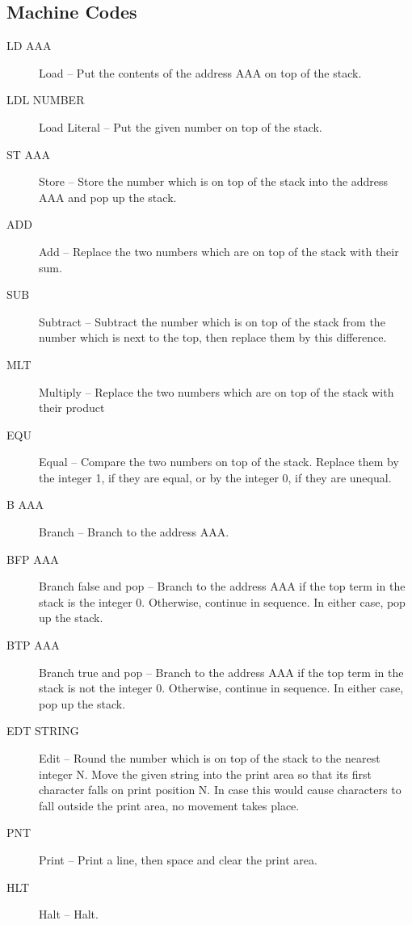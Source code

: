 \documentclass[twocolumn]{article}
\begin{document}
\subsection{Machine Codes}
\begin{description}
\item[LD AAA]      Load -- Put the contents of the address AAA on top of the stack.

\item[LDL NUMBER]  Load Literal -- Put the given number on top of the stack.

\item[ST AAA]      Store -- Store the number which is on top of the stack into the address AAA and pop up the stack.

\item[ADD]         Add -- Replace the two numbers which are on top of the stack with their sum.

\item[SUB]         Subtract -- Subtract the number which is on top of the stack from
the number which is next to the top, then replace them by this difference.

\item[MLT]         Multiply -- Replace the two numbers which are on top of the stack
with their product

\item[EQU]         Equal -- Compare the two numbers on top of the stack. Replace them
by the integer 1, if they are equal, or by the integer 0, if they are unequal.

\item[B AAA]       Branch -- Branch to the address AAA.

\item[BFP AAA]     Branch false and pop -- Branch to the address AAA if the top term
in the stack is the integer 0. Otherwise, continue in sequence. In either case,
pop up the stack.

\item[BTP AAA]     Branch true and pop -- Branch to the address AAA if the top term
in the stack is not the integer 0. Otherwise, continue in sequence. In either
case, pop up the stack.

\item[EDT STRING]  Edit -- Round the number which is on top of the stack to the nearest
integer N. Move the given string into the print area so that its first character
falls on print position N. In case this would cause characters to fall outside
the print area, no movement takes place.

\item[PNT]        Print -- Print a line, then space and clear the print area.

\item[HLT]        Halt -- Halt.
\end{description}
\end{document}
